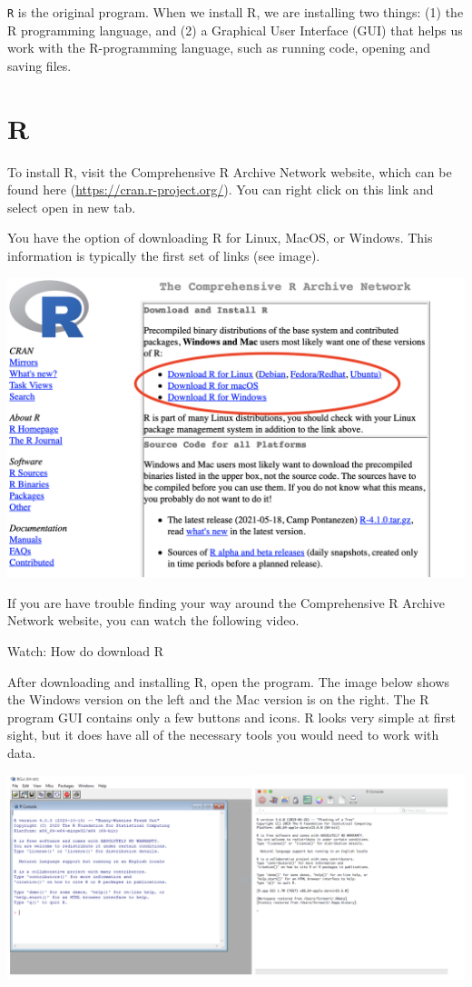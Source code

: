 \documentclass[
]{book}
\begin{document}
\texttt{R} is the original program. When we install R, we are installing two things: (1) the R programming language, and (2) a Graphical User Interface (GUI) that helps us work with the R-programming language, such as running code, opening and saving files.

\hypertarget{r}{%
\section{R}\label{r}}

To install R, visit the Comprehensive R Archive Network website, which can be found here (\url{https://cran.r-project.org/}). You can right click on this link and select open in new tab.

You have the option of downloading R for Linux, MacOS, or Windows. This information is typically the first set of links (see image).

\includegraphics[width=1\linewidth]{images-figures/02-r-website}

If you are have trouble finding your way around the Comprehensive R Archive Network website, you can watch the following video.

Watch: How do download R

After downloading and installing R, open the program. The image below shows the Windows version on the left and the Mac version is on the right. The R program GUI contains only a few buttons and icons. R looks very simple at first sight, but it does have all of the necessary tools you would need to work with data.

\includegraphics[width=1\linewidth]{images-figures/02-r-programs}
\end{document}
